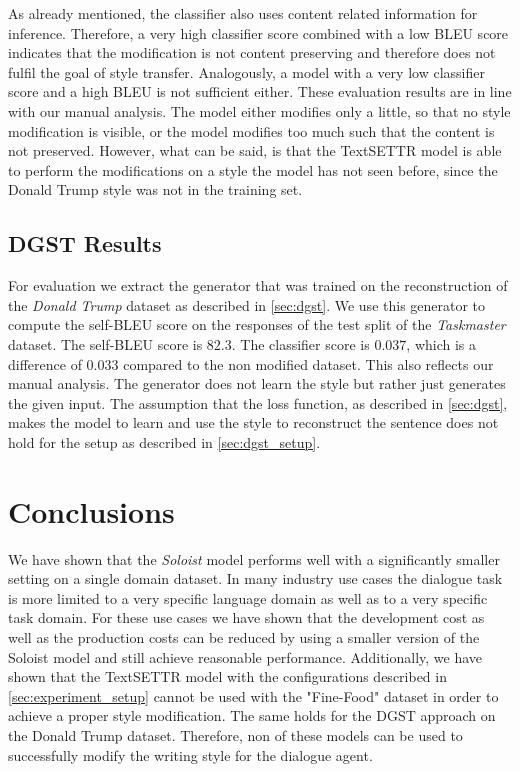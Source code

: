 \documentclass[twocolumn]{tum-article}
\begin{document}
As already mentioned, the classifier also uses content related information for inference. Therefore, a very high classifier score combined with a low BLEU score indicates that the modification is not content preserving and therefore does not fulfil the goal of style transfer. Analogously, a model with a very low classifier score and a high BLEU is not sufficient either. These evaluation results are in line with our manual analysis. The model either modifies only a little, so that no style modification is visible, or the model modifies too much such that the content is not preserved. However, what can be said, is that the TextSETTR model is able to perform the modifications on a style the model has not seen before, since the Donald Trump style was not in the training set.  
\subsection{DGST Results}
For evaluation we extract the generator that was trained on the reconstruction of the \textit{Donald Trump} dataset as described in \autoref{sec:dgst}. We use this generator to compute the self-BLEU score on the responses of the test split of the \textit{Taskmaster} dataset. The self-BLEU score is $82.3$. The classifier score is $0.037$, which is a difference of $0.033$ compared to the non modified dataset. This also reflects our manual analysis. The generator does not learn the style but rather just generates the given input. The assumption that the loss function, as described in \autoref{sec:dgst}, makes the model to learn and use the style to reconstruct the sentence does not hold for the setup as described in \autoref{sec:dgst_setup}.
\section{Conclusions}
We have shown that the \textit{Soloist} model performs well with a significantly smaller setting on a single domain dataset. In many industry use cases the dialogue task is more limited to a very specific language domain as well as to a very specific task domain. For these use cases we have shown that the development cost as well as the production costs can be reduced by using a smaller version of the Soloist model and still achieve reasonable performance. Additionally, we have shown that the TextSETTR model with the configurations described in \autoref{sec:experiment_setup} cannot be used with the "Fine-Food" dataset in order to achieve a proper style modification. The same holds for the DGST approach on the Donald Trump dataset. Therefore, non of these models can be used to successfully modify the writing style for the dialogue agent.
\end{document}
